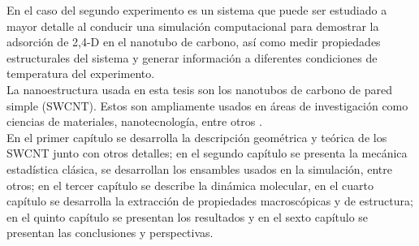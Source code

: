 En el caso del segundo experimento es un sistema que puede ser estudiado a mayor detalle \cite{rocha2017} al conducir una simulación computacional para demostrar la adsorción de 2,4-D en el nanotubo de carbono, así como medir propiedades estructurales del sistema y generar información a diferentes condiciones de temperatura del experimento.\\

La nanoestructura usada en esta tesis son los nanotubos de carbono de pared simple (SWCNT). Estos son ampliamente usados en áreas de investigación como ciencias de materiales, nanotecnología, entre otros \cite{KAUR2019} \cite{SARKAR2018}. \\

En el primer capítulo se desarrolla la descripción geométrica y teórica de los SWCNT junto con otros detalles; en el segundo capítulo se presenta la mecánica estadística clásica, se desarrollan los ensambles usados en la simulación, entre otros; en el tercer capítulo se describe la dinámica molecular, en el cuarto capítulo se desarrolla la extracción de propiedades macroscópicas y de estructura; en el quinto capítulo se presentan los resultados y en el sexto capítulo se presentan las conclusiones y perspectivas.






